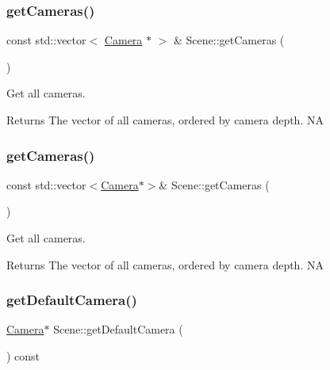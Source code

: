 \subsubsection{\texorpdfstring{get\+Cameras()}{getCameras()}\hspace{0.1cm}{\footnotesize\ttfamily [1/2]}}
{\footnotesize\ttfamily const std\+::vector$<$ \hyperlink{classCamera}{Camera} $\ast$ $>$ \& Scene\+::get\+Cameras (\begin{DoxyParamCaption}{ }\end{DoxyParamCaption})}

Get all cameras.

\begin{DoxyReturn}{Returns}
The vector of all cameras, ordered by camera depth.  NA 
\end{DoxyReturn}
\mbox{\label{classScene_a6498f3056fa7a586181fee2bc863edf5}} 
\subsubsection{\texorpdfstring{get\+Cameras()}{getCameras()}\hspace{0.1cm}{\footnotesize\ttfamily [2/2]}}
{\footnotesize\ttfamily const std\+::vector$<$\hyperlink{classCamera}{Camera}$\ast$$>$\& Scene\+::get\+Cameras (\begin{DoxyParamCaption}{ }\end{DoxyParamCaption})}

Get all cameras.

\begin{DoxyReturn}{Returns}
The vector of all cameras, ordered by camera depth.  NA 
\end{DoxyReturn}
\mbox{\label{classScene_a3c0cfe939da06f1ffe9a5ad9914bbde4}} 
\subsubsection{\texorpdfstring{get\+Default\+Camera()}{getDefaultCamera()}\hspace{0.1cm}{\footnotesize\ttfamily [1/2]}}
{\footnotesize\ttfamily \hyperlink{classCamera}{Camera}$\ast$ Scene\+::get\+Default\+Camera (\begin{DoxyParamCaption}{ }\end{DoxyParamCaption}) const\hspace{0.3cm}{\ttfamily [inline]}}

